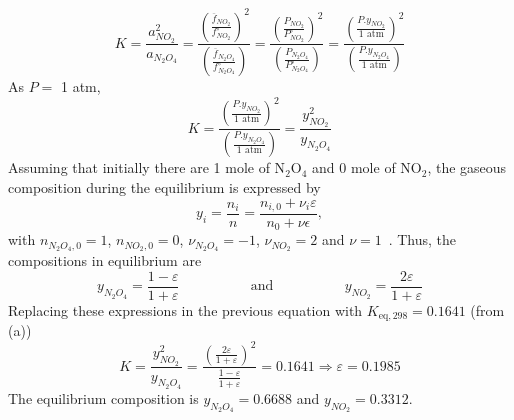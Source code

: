 \documentclass[calculator,allquestions,datasheet,solutions]{exam_newMarcus2}
\newcommand{\frc}{\displaystyle\frac}
\begin{document}
\begin{question}
\begin{enumerate}[(a)]
{             \begin{displaymath} 
                 K = \frc{a^{2}_{NO_{2}}}{a_{N_{2}O_{4}}} = \frc{\left(\frc{\overline{f}_{NO_{2}}}{f^{\circ}_{NO_{2}}}\right)^{2}}{\left(\frc{\overline{f}_{N_{2}O_{4}}}{f^{\circ}_{N_{2}O_{4}}}\right)} = \frc{\left(\frc{P_{NO_{2}}}{P^{\circ}_{NO_{2}}}\right)^{2}}{\left(\frc{P_{N_{2}O_{4}}}{P^{\circ}_{N_{2}O_{4}}}\right)} = \frc{\left(\frc{P.y_{NO_{2}}}{1\text{ atm}}\right)^{2}}{\left(\frc{P.y_{N_{2}O_{4}}}{1 \text{ atm}}\right)}  
             \end{displaymath}
             As $P=$ 1 atm,~
             \begin{displaymath} 
                 K = \frc{\left(\frc{P.y_{NO_{2}}}{1\text{ atm}}\right)^{2}}{\left(\frc{P.y_{N_{2}O_{4}}}{1 \text{ atm}}\right)}  = \frc{y^{2}_{NO_{2}}}{y_{N_{2}O_{4}}} 
             \end{displaymath}
             Assuming that initially there are 1 mole of N$_{2}$O$_{4}$ and 0 mole of NO$_{2}$, the gaseous composition during the equilibrium is expressed by
             \begin{displaymath}
               y_{i} = \frc{n_{i}}{n} = \frc{n_{i,0}+\nu_{i}\varepsilon}{n_{0}+\nu\epsilon},
             \end{displaymath}
             with $n_{N_{2}O_{4},0}=1$, $n_{NO_{2},0}=0$, $\nu_{N_{2}O_{4}}=-1$, $\nu_{NO_{2}}=2$ and $\nu = 1$~. Thus, the compositions in equilibrium are~
              \begin{displaymath}
                  y_{N_{2}O_{4}} = \frc{1-\varepsilon}{1+\varepsilon} \hspace{2cm}\text{ and }\hspace{2cm} y_{NO_{2}}= \frc{2\varepsilon}{1+\varepsilon}
              \end{displaymath}
              Replacing these expressions in the previous equation with $K_{\text{eq},298}= 0.1641$ (from (a))~
              \begin{displaymath}
                 K =  \frc{y^{2}_{NO_{2}}}{y_{N_{2}O_{4}}} = \frc{\left(\frc{2\varepsilon}{1+\varepsilon}\right)^{2}}{\frc{1-\varepsilon}{1+\varepsilon}} = 0.1641 \Longrightarrow \varepsilon = 0.1985
             \end{displaymath}
            The equilibrium composition is $y_{N_{2}O_{4}}=0.6688$ and $y_{NO_{2}}=0.3312$.~
}
%
  \end{enumerate}
%


\end{question}
\end{document}

